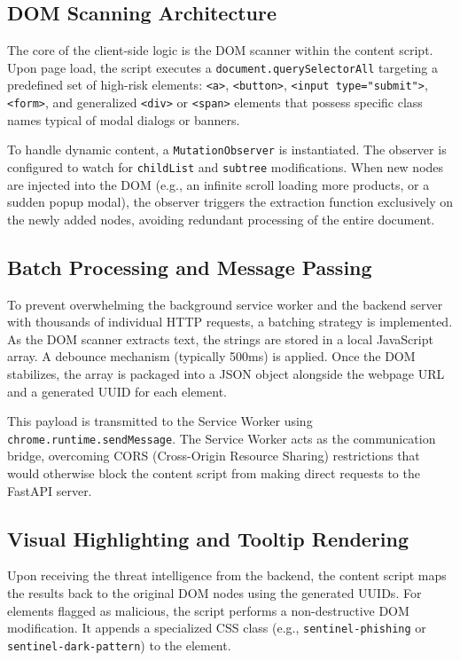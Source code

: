 \documentclass[12pt,a4paper]{report}
\begin{document}
\subsection{DOM Scanning Architecture}
The core of the client-side logic is the DOM scanner within the content script. Upon page load, the script executes a \texttt{document.querySelectorAll} targeting a predefined set of high-risk elements: \texttt{<a>}, \texttt{<button>}, \texttt{<input type="submit">}, \texttt{<form>}, and generalized \texttt{<div>} or \texttt{<span>} elements that possess specific class names typical of modal dialogs or banners.

To handle dynamic content, a \texttt{MutationObserver} is instantiated. The observer is configured to watch for \texttt{childList} and \texttt{subtree} modifications. When new nodes are injected into the DOM (e.g., an infinite scroll loading more products, or a sudden popup modal), the observer triggers the extraction function exclusively on the newly added nodes, avoiding redundant processing of the entire document.

\subsection{Batch Processing and Message Passing}
To prevent overwhelming the background service worker and the backend server with thousands of individual HTTP requests, a batching strategy is implemented. As the DOM scanner extracts text, the strings are stored in a local JavaScript array. A debounce mechanism (typically 500ms) is applied. Once the DOM stabilizes, the array is packaged into a JSON object alongside the webpage URL and a generated UUID for each element.

This payload is transmitted to the Service Worker using \texttt{chrome.runtime.sendMessage}. The Service Worker acts as the communication bridge, overcoming CORS (Cross-Origin Resource Sharing) restrictions that would otherwise block the content script from making direct requests to the FastAPI server.

\subsection{Visual Highlighting and Tooltip Rendering}
Upon receiving the threat intelligence from the backend, the content script maps the results back to the original DOM nodes using the generated UUIDs. For elements flagged as malicious, the script performs a non-destructive DOM modification. It appends a specialized CSS class (e.g., \texttt{sentinel-phishing} or \texttt{sentinel-dark-pattern}) to the element.
\end{document}

